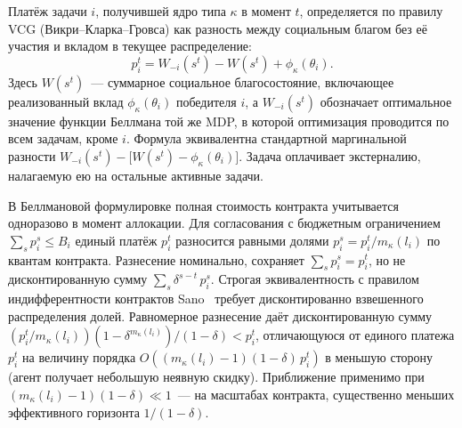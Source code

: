 \documentclass[14pt, oneside]{extbook}
\begin{document}
        Платёж задачи $i$, получившей ядро типа $\kappa$
        в момент $t$, определяется по правилу VCG
        (Викри--Кларка--Гровса) как разность между социальным
        благом без её участия и вкладом в текущее распределение:
        \begin{equation*}
                p_i^t = W_{-i}(s^t) - W(s^t) + \phi_\kappa(\theta_i).
        \end{equation*}
        Здесь $W(s^t)$~--- суммарное социальное благосостояние,
        включающее реализованный вклад $\phi_\kappa(\theta_i)$
        победителя $i$, а $W_{-i}(s^t)$ обозначает оптимальное
        значение функции Беллмана той же MDP, в которой оптимизация
        проводится по всем задачам, кроме $i$. Формула эквивалентна
        стандартной маргинальной разности
        $W_{-i}(s^t) - \bigl[W(s^t) - \phi_\kappa(\theta_i)\bigr]$.
        Задача оплачивает экстерналию, налагаемую ею
        на остальные активные задачи.

        В Беллмановой формулировке
        полная стоимость контракта учитывается одноразово в
        момент аллокации. Для согласования с бюджетным
        ограничением $\sum_s p_i^s \leq B_i$ единый платёж
        $p_i^t$ разносится равными долями $p_i^s =
        p_i^t / m_\kappa(l_i)$ по квантам контракта.
        Разнесение номинально, сохраняет
        $\sum_s p_i^s = p_i^t$, но не дисконтированную сумму
        $\sum_s \delta^{s-t}\,p_i^s$. Строгая эквивалентность
        с правилом индифферентности контрактов Sano~\cite{sano}
        требует дисконтированно взвешенного распределения долей.
        Равномерное разнесение даёт дисконтированную сумму
        $(p_i^t/m_\kappa(l_i))(1-\delta^{m_\kappa(l_i)})/(1-\delta) <
        p_i^t$, отличающуюся от единого платежа $p_i^t$
        на величину порядка
        $O((m_\kappa(l_i) - 1)(1-\delta)\,p_i^t)$ в меньшую
        сторону (агент получает небольшую неявную скидку).
        Приближение применимо при
        $(m_\kappa(l_i) - 1)(1-\delta) \ll 1$~--- на масштабах
        контракта, существенно меньших эффективного горизонта
        $1/(1-\delta)$.
\end{document}

